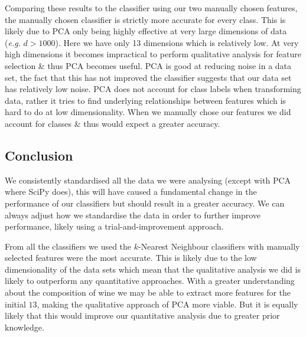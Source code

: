 \documentclass[11pt,a4paper]{article}
\begin{document}
\indent Comparing these results to the classifier using our two manually chosen features, the manually chosen classifier is strictly more accurate for every class. This is likely due to PCA only being highly effective at very large dimensions of data (\textit{e.g.} $d>1000$). Here we have only 13 dimensions which is relatively low. At very high dimensions it becomes impractical to perform qualitative analysis for feature selection \& thus PCA becomes useful. PCA is good at reducing noise in a data set, the fact that this has not improved the classifier suggests that our data set has relatively low noise. PCA does not account for class labels when transforming data, rather it tries to find underlying relationships between features which is hard to do at low dimensionality. When we manually chose our features we did account for classes \& thus would expect a greater accuracy.

\subsection*{Conclusion}
We consistently standardised all the data we were analysing (except with PCA where SciPy does), this will have caused a fundamental change in the performance of our classifiers but should result in a greater accuracy. We can always adjust how we standardise the data in order to further improve performance, likely using a trial-and-improvement approach.

\indent From all the classifiers we used the $k$-Nearest Neighbour classifiers with manually selected features were the most accurate. This is likely due to the low dimensionality of the data sets which mean that the qualitative analysis we did is likely to outperform any quantitative approaches. With a greater understanding about the composition of wine we may be able to extract more features for the initial $13$, making the qualitative approach of PCA more viable. But it is equally likely that this would improve our quantitative analysis due to greater prior knowledge.
\end{document}

